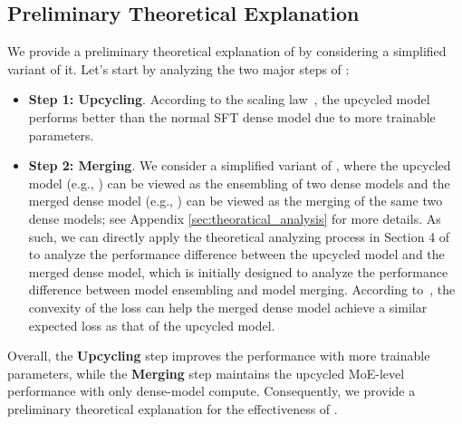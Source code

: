 \subsection{Preliminary Theoretical Explanation}
We provide a preliminary theoretical explanation of \ours by considering a simplified variant of it. Let’s start by analyzing the two major steps of \ours:
\begin{itemize}[leftmargin=1em]
    \setlength{\parskip}{2pt}
    \setlength\itemsep{0pt}
    \item \textbf{Step 1: Upcycling}. According to the scaling law~\cite{kaplan2020scaling}, the upcycled \moe model performs better than the normal SFT dense model due to more trainable parameters.
    \item \textbf{Step 2: Merging}. We consider a simplified variant of \ours, where the upcycled \moe model (e.g., \oursmoe) can be viewed as the ensembling of two dense models and the merged dense model (e.g., \oursmerge) can be viewed as the merging of the same two dense models; see Appendix \ref{sec:theoratical_analysis} for more details. As such, we can directly apply the theoretical analyzing process in Section 4 of~\cite{wortsman2022model} to analyze the performance difference between the upcycled \moe model and the merged dense model, which is initially designed to analyze the performance difference between model ensembling and model merging. According to~\cite{wortsman2022model}, the convexity of the loss can help the merged dense model achieve a similar expected loss as that of the upcycled \moe model.
\end{itemize}

Overall, the \textbf{Upcycling} step improves the performance with more trainable parameters, while the \textbf{Merging} step maintains the upcycled MoE-level performance with only dense-model compute. Consequently, we provide a preliminary theoretical explanation for the effectiveness of \ours.


